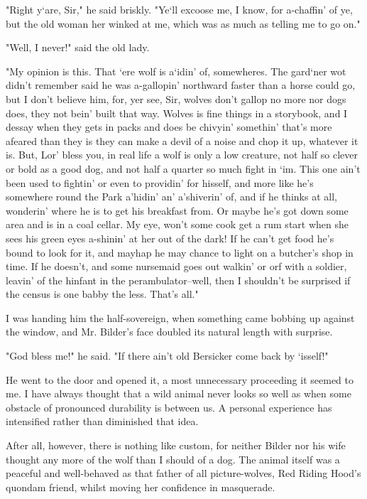 "Right y`are, Sir," he said briskly. "Ye`ll excoose me, I know, for a-chaffin' of ye, but the old woman her winked at me, which was as much as telling me to go on." 

"Well, I never!" said the old lady. 

"My opinion is this. That `ere wolf is a`idin' of, somewheres. The gard`ner wot didn't remember said he was a-gallopin' northward faster than a horse could go, but I don't believe him, for, yer see, Sir, wolves don't gallop no more nor dogs does, they not bein' built that way. Wolves is fine things in a storybook, and I dessay when they gets in packs and does be chivyin' somethin' that's more afeared than they is they can make a devil of a noise and chop it up, whatever it is. But, Lor' bless you, in real life a wolf is only a low creature, not half so clever or bold as a good dog, and not half a quarter so much fight in `im. This one ain't been used to fightin' or even to providin' for hisself, and more like he's somewhere round the Park a'hidin' an' a'shiverin' of, and if he thinks at all, wonderin' where he is to get his breakfast from. Or maybe he's got down some area and is in a coal cellar. My eye, won't some cook get a rum start when she sees his green eyes a-shinin' at her out of the dark! If he can't get food he's bound to look for it, and mayhap he may chance to light on a butcher's shop in time. If he doesn't, and some nursemaid goes out walkin' or orf with a soldier, leavin' of the hinfant in the perambulator--well, then I shouldn't be surprised if the census is one babby the less. That's all." 

I was handing him the half-sovereign, when something came bobbing up against the window, and Mr. Bilder's face doubled its natural length with surprise. 

"God bless me!" he said. "If there ain't old Bersicker come back by `isself!" 

He went to the door and opened it, a most unnecessary proceeding it seemed to me. I have always thought that a wild animal never looks so well as when some obstacle of pronounced durability is between us. A personal experience has intensified rather than diminished that idea. 

After all, however, there is nothing like custom, for neither Bilder nor his wife thought any more of the wolf than I should of a dog. The animal itself was a peaceful and well-behaved as that father of all picture-wolves, Red Riding Hood's quondam friend, whilst moving her confidence in masquerade. 

